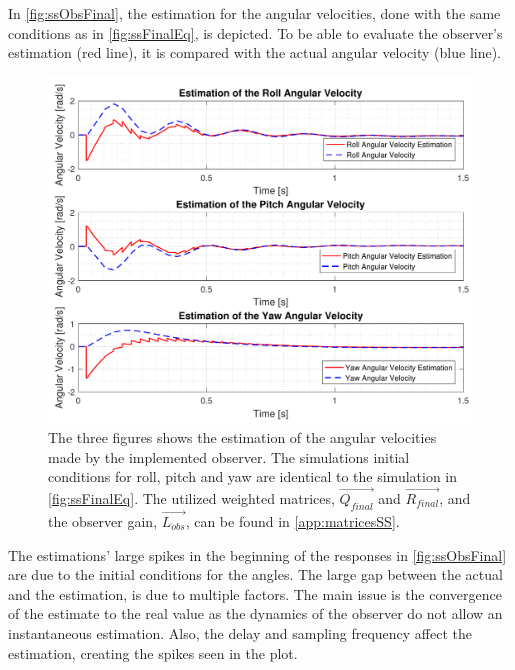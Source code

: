 In \autoref{fig:ssObsFinal}, the estimation for the angular velocities, done with the same conditions as in \autoref{fig:ssFinalEq}, is depicted. To be able to evaluate the observer's estimation (red line), it is compared with the actual angular velocity (blue line). 

\begin{figure}[H]
	\centering
	\includegraphics[scale=0.7]{figures/ssObsFinal.pdf}
	\caption{The three figures shows the estimation of the angular velocities made by the implemented observer. The simulations initial conditions for roll, pitch and yaw are identical to the simulation in \autoref{fig:ssFinalEq}. The utilized weighted matrices, $\vec{Q_{final}}$ and $\vec{R_{final}}$, and the observer gain, $\vec{L_{obs}}$, can be found in \autoref{app:matricesSS}.}
	\label{fig:ssObsFinal}
\end{figure}
%
The estimations' large spikes in the beginning of the responses in \autoref{fig:ssObsFinal} are due to the initial conditions for the angles. The large gap between the actual and the estimation, is due to multiple factors. The main issue is the convergence of the estimate to the real value as the dynamics of the observer do not allow an instantaneous estimation. Also, the delay and sampling frequency affect the estimation, creating the spikes seen in the plot. %

